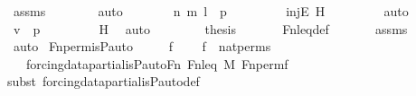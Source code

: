 \begin{isabellebody}
\ assms\isanewline
\ \ \ \ \ \ \isamarkupfalse%
\ auto\isanewline
\ \ \ \ \isamarkupfalse%
\ \isamarkupfalse%
\ {\isachardoublequoteopen}{\isacharless}{\kern0pt}{\isacharless}{\kern0pt}n{\isacharcomma}{\kern0pt}\ m{\isachargreater}{\kern0pt}{\isacharcomma}{\kern0pt}\ l{\isachargreater}{\kern0pt}\ {\isasymin}\ p{\isachardoublequoteclose}\ \isanewline
\ \ \ \ \ \ \isamarkupfalse%
\ injE\ H\ \isanewline
\ \ \ \ \ \ \isamarkupfalse%
\ auto\isanewline
\ \ \ \ \isamarkupfalse%
\ \isamarkupfalse%
\ {\isachardoublequoteopen}v\ {\isasymin}\ p{\isachardoublequoteclose}\ \isanewline
\ \ \ \ \ \ \isamarkupfalse%
\ H\ \isamarkupfalse%
\ auto\isanewline
\ \ \isamarkupfalse%
\isanewline
\ \ \isamarkupfalse%
\ \isamarkupfalse%
\ {\isacharquery}{\kern0pt}thesis\ \isanewline
\ \ \ \ \isamarkupfalse%
\ Fn{\isacharunderscore}{\kern0pt}leq{\isacharunderscore}{\kern0pt}def\ \isanewline
\ \ \ \ \isamarkupfalse%
\ assms\isanewline
\ \ \ \ \isamarkupfalse%
\ auto\isanewline
{}\isamarkupfalse%
%
\endisatagproof
{\isafoldproof}%
%
\isadelimproof
\isanewline
%
\endisadelimproof
\isanewline
{}\isamarkupfalse%
\ Fn{\isacharunderscore}{\kern0pt}perm{\isacharprime}{\kern0pt}{\isacharunderscore}{\kern0pt}is{\isacharunderscore}{\kern0pt}P{\isacharunderscore}{\kern0pt}auto\ {\isacharcolon}{\kern0pt}\ \isanewline
\ \ \ f\ \isanewline
\ \ \ {\isachardoublequoteopen}f\ {\isasymin}\ nat{\isacharunderscore}{\kern0pt}perms{\isachardoublequoteclose}\ \isanewline
\ \ \ {\isachardoublequoteopen}forcing{\isacharunderscore}{\kern0pt}data{\isacharunderscore}{\kern0pt}partial{\isachardot}{\kern0pt}is{\isacharunderscore}{\kern0pt}P{\isacharunderscore}{\kern0pt}auto{\isacharparenleft}{\kern0pt}Fn{\isacharcomma}{\kern0pt}\ Fn{\isacharunderscore}{\kern0pt}leq{\isacharcomma}{\kern0pt}\ M{\isacharcomma}{\kern0pt}\ Fn{\isacharunderscore}{\kern0pt}perm{\isacharprime}{\kern0pt}{\isacharparenleft}{\kern0pt}f{\isacharparenright}{\kern0pt}{\isacharparenright}{\kern0pt}{\isachardoublequoteclose}\isanewline
%
\isadelimproof
\isanewline
\ \ %
\endisadelimproof
%
\isatagproof
{}\isamarkupfalse%
{\isacharparenleft}{\kern0pt}subst\ forcing{\isacharunderscore}{\kern0pt}data{\isacharunderscore}{\kern0pt}partial{\isachardot}{\kern0pt}is{\isacharunderscore}{\kern0pt}P{\isacharunderscore}{\kern0pt}auto{\isacharunderscore}{\kern0pt}def{\isacharparenright}{\kern0pt}\isanewline

\end{isabellebody}
